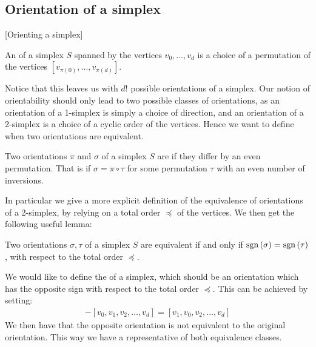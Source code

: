 \subsection{Orientation of a simplex}[Orienting a simplex]
\label{sec:orientation_of_simplex}

\begin{definition}
    An  of a simplex $S$ spanned by the vertices $v_0, \dots, v_d$ is a choice of a permutation of the vertices $[v_{\pi(0)}, \dots, v_{\pi(d)}]$.
\end{definition}

Notice that this leaves us with $d!$ possible orientations of a simplex. Our notion of orientability should only lead to two possible classes of orientations, as an orientation of a 1-simplex is simply a choice of direction, and an orientation of a 2-simplex is a choice of a cyclic order of the vertices. Hence we want to define when two orientations are equivalent.

\begin{definition}
    Two orientations $\pi$ and $\sigma$ of a simplex $S$ are  if they differ by an even permutation. That is if $\sigma = \pi \circ \tau$ for some permutation $\tau$ with an even number of inversions.
\end{definition}

In particular we give a more explicit definition of the equivalence of orientations of a 2-simplex, by relying on a total order $\preceq$ of the vertices. We then get the following useful lemma:

\begin{lemma}
    Two orientations $\sigma, \tau$ of a simplex $S$ are equivalent if and only if $\operatorname{sgn}\left(\sigma\right) = \operatorname{sgn}\left(\tau\right)$, with respect to the total order $\preceq$.
\end{lemma}

We would like to define the  of a simplex, which should be an orientation which has the opposite sign with respect to the total order $\preceq$. This can be achieved by setting:
\begin{align*}
    - [v_0, v_1, v_2, \dots, v_d] = [v_1, v_0, v_2, \dots, v_d]
\end{align*}
We then have that the opposite orientation is not equivalent to the original orientation. This way we have a representative of both equivalence classes.

